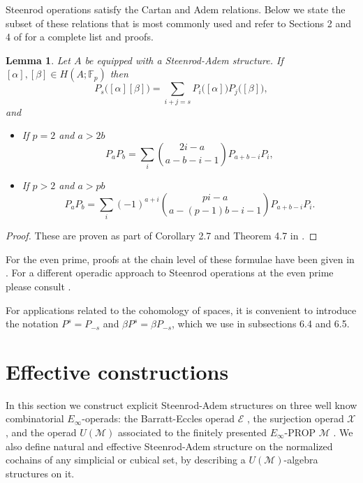 \documentclass[A4]{amsart}
\newtheorem{lemma}[theorem]{Lemma}
\theoremstyle{definition}
\begin{document}
Steenrod operations satisfy the Cartan and Adem relations. Below we state the subset of these relations that is most commonly used and refer to Sections 2 and 4 of \cite{may70generalapproach} for a complete list and proofs.
\begin{lemma}
	Let $A$ be equipped with a Steenrod-Adem structure. If $[\alpha], [\beta] \in H(A;\mathbb{F}_p)$ then
	\begin{equation*}
	P_s\big([\alpha] [\beta]\big) = \sum_{i+j=s} P_i\big( [\alpha] \big) P_j\big( [\beta] \big),
	\end{equation*}
	and
	\begin{itemize}
		\item If $p = 2$ and $a > 2b$
		\begin{equation*}
		P_{a}P_{b} = \sum_i {2i-a \choose a-b-i-1} P_{a+b-i}P_i,
		\end{equation*}
		\item If $p > 2$ and $a > pb$
		\begin{equation*}
		P_{a}P_{b} = \sum_i (-1)^{a+i}{pi-a \choose a-(p-1)b-i-1} P_{a+b-i}P_i.
		\end{equation*}
	\end{itemize}		
\end{lemma}

\begin{proof}
	These are proven as part of Corollary 2.7 and Theorem 4.7 in \cite{may70generalapproach}.
\end{proof}

For the even prime, proofs at the chain level of these formulae have been given in \cite{medina2020cartan,brumfiel2020cochain}. For a different operadic approach to Steenrod operations at the even prime please consult \cite{chataur2005adem-cartan}.

For applications related to the cohomology of spaces, it is convenient to introduce the notation $P^s = P_{-s}$ and $\beta P^s = \beta P_{-s}$, which we use in subsections 6.4 and 6.5.

\section{Effective constructions}
\label{sec: effective constructions}	

In this section we construct explicit Steenrod-Adem structures on three well know combinatorial $E_\infty$-operads: the Barratt-Eccles operad $\mathcal E$ \cite{berger04combinatorial}, the surjection operad $\mathcal X$ \cite{mcclure03cochain}, and the operad $U(\mathcal M)$ associated to the finitely presented $E_\infty$-PROP $\mathcal M$ \cite{medina2020prop1}. We also define natural and effective Steenrod-Adem structure on the normalized cochains of any simplicial or cubical set, by describing a $U(\mathcal M)$-algebra structures on it.
\end{document}
